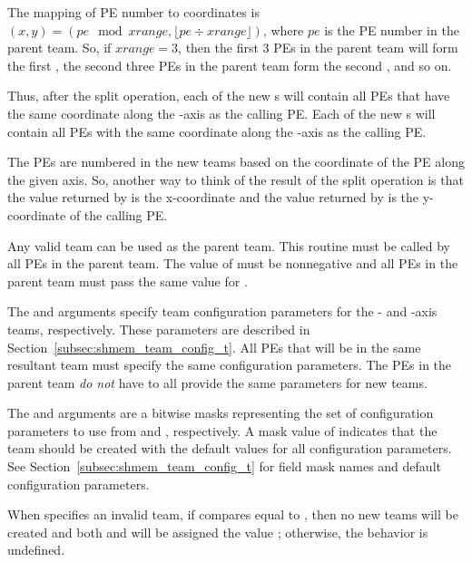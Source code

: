 \begin{apidefinition}
{The mapping of \ac{PE} number to coordinates is $(x, y) = ( pe \mod xrange, \lfloor pe \div xrange \rfloor )$,
where $pe$ is the \ac{PE} number in the parent team. So, if $xrange = 3$,
then the first 3 \acp{PE} in the parent team will form the first
, the second three \acp{PE} in the parent team form the second ,
and so on.

Thus, after the split operation, each of the new s will contain all \acp{PE} that
have the same coordinate along the -axis as the calling \ac{PE}. Each of the
new s will contain all \acp{PE} with the same coordinate along the
-axis as the calling \ac{PE}.

The \acp{PE} are numbered in the new teams based on the coordinate of the
\ac{PE} along the given axis. So, another way to think of the result of the split
operation is that the value returned by  is the
x-coordinate and the value returned by 
is the y-coordinate of the calling \ac{PE}.

Any valid \openshmem team can be used as the parent team. This routine must be
called by all \acp{PE} in the parent team. The value of  must be
nonnegative and all \acp{PE} in the parent team must pass the same value for
.

The  and  arguments specify team
configuration parameters for the - and -axis teams, respectively.
These parameters are described in Section~\ref{subsec:shmem_team_config_t}.
All \acp{PE} that will be in the same resultant team must specify the same
configuration parameters.
The \acp{PE} in the parent team \emph{do not} have to all provide the same
parameters for new teams.

The  and  arguments are a bitwise masks
representing the set of configuration parameters to use from
 and , respectively.
A mask value of  indicates that the team
should be created with the default values for all configuration parameters.
See Section~\ref{subsec:shmem_team_config_t} for field mask names and
default configuration parameters.

When  specifies an invalid team, if
 compares equal to
, then no new teams will be created
and both  and  will be assigned the
value ; otherwise, the behavior is
undefined.

}
\end{apidefinition}
